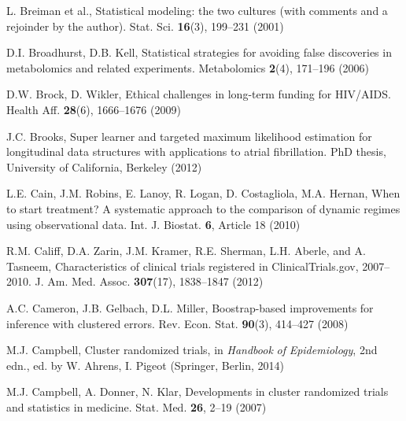 \begin{list}{}{\setlength{\leftmargin}{2.1em}\setlength{\labelwidth}{0pt}
  \setlength{\labelsep}{0pt}\setlength{\itemindent}{-2.1em}
  \setlength{\parsep}{0pt}\setlength{\itemsep}{2pt}\setlength{\topsep}{0pt}}
\item\label{refentry:REF044}L. Breiman et al., Statistical modeling: the two cultures (with comments and a rejoinder by the author). Stat. Sci. \textbf{16}(3), 199--231 (2001)\label{refend:REF044}
\item\label{refentry:REF045}D.I. Broadhurst, D.B. Kell, Statistical strategies for avoiding false discoveries in metabolomics and related experiments. Metabolomics \textbf{2}(4), 171--196 (2006)\label{refend:REF045}
\item\label{refentry:REF046}D.W. Brock, D. Wikler, Ethical challenges in long-term funding for HIV/AIDS. Health Aff. \textbf{28}(6), 1666--1676 (2009)\label{refend:REF046}
\item\label{refentry:REF047}J.C. Brooks, Super learner and targeted maximum likelihood estimation for longitudinal data structures with applications to atrial fibrillation. PhD thesis, University of California, Berkeley (2012)\label{refend:REF047}
\item\label{refentry:REF048}L.E. Cain, J.M. Robins, E. Lanoy, R. Logan, D. Costagliola, M.A. Hernan, When to start treatment? A systematic approach to the comparison of dynamic regimes using observational data. Int. J. Biostat. \textbf{6}, Article 18 (2010)\label{refend:REF048}
\item\label{refentry:REF049}R.M. Califf, D.A. Zarin, J.M. Kramer, R.E. Sherman, L.H. Aberle, and A. Tasneem, Characteristics of clinical trials registered in ClinicalTrials.gov, 2007--2010. J. Am. Med. Assoc. \textbf{307}(17), 1838--1847 (2012)\label{refend:REF049}
\item\label{refentry:REF050}A.C. Cameron, J.B. Gelbach, D.L. Miller, Boostrap-based improvements for inference with clustered errors. Rev. Econ. Stat. \textbf{90}(3), 414--427 (2008)\label{refend:REF050}
\item\label{refentry:REF051}M.J. Campbell, Cluster randomized trials, in \textit{Handbook} \textit{of} \textit{Epidemiology}, 2nd edn., ed. by W. Ahrens, I. Pigeot (Springer, Berlin, 2014)\label{refend:REF051}
\item\label{refentry:REF052}M.J. Campbell, A. Donner, N. Klar, Developments in cluster randomized trials and statistics in medicine. Stat. Med. \textbf{26}, 2--19 (2007)\label{refend:REF052}

\end{list}
